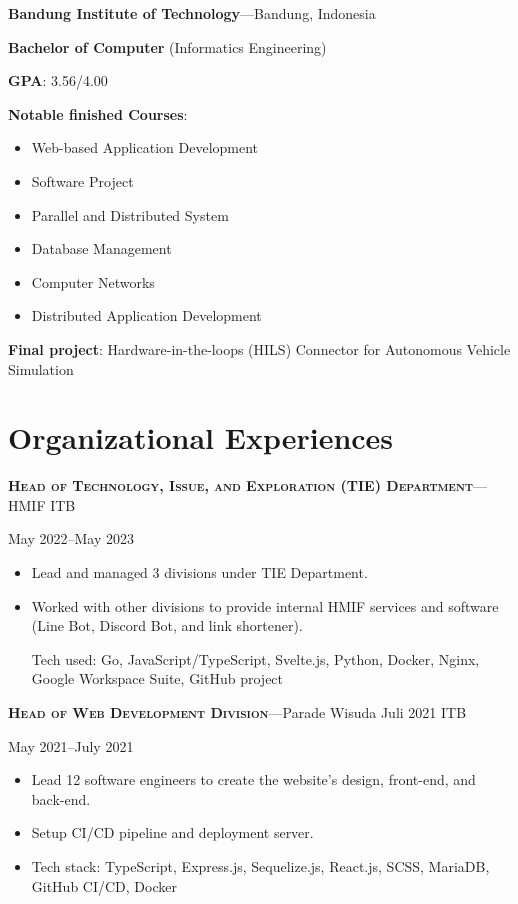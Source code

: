 \documentclass[10pt]{article}
\newcommand{\workExpVspace}{1em}
\newcommand{\orgExp}[5]{
    \noindent \textbf{\textsc{#1}}---#2

    {#3}--{#4}

    {#5}
    \vspace{\workExpVspace}
}
\begin{document}
\textbf{Bandung Institute of Technology}---Bandung, Indonesia

\textbf{Bachelor of Computer} (Informatics Engineering)

\textbf{GPA}: 3.56/4.00

\textbf{Notable finished Courses}:
\begin{multicols}{2}
    \begin{itemize}
        \item Web-based Application Development
        \item Software Project
        \item Parallel and Distributed System
        \item Database Management
        \item Computer Networks
        \item Distributed Application Development
    \end{itemize}
\end{multicols}

\textbf{Final project}: Hardware-in-the-loops (HILS) Connector for Autonomous Vehicle Simulation

\section{Organizational Experiences}

\orgExp
    {Head of Technology, Issue, and Exploration (TIE) Department}
    {HMIF ITB}
    {May 2022}
    {May 2023}
    {
        \begin{itemize}
            \item Lead and managed 3 divisions under TIE Department.
            \item Worked with other divisions to provide internal HMIF services and software (Line
                Bot, Discord Bot, and link shortener).

                Tech used: Go, JavaScript/TypeScript, Svelte.js, Python, Docker, Nginx, Google
                Workspace Suite, GitHub project
        \end{itemize}
    }
    
\orgExp
{Head of Web Development Division}
{Parade Wisuda Juli 2021 ITB}
{May 2021}
{July 2021}
{
    \begin{itemize}
        \item Lead 12 software engineers to create the website's design, front-end, and back-end.
        \item Setup CI/CD pipeline and deployment server.
        \item Tech stack: TypeScript, Express.js, Sequelize.js, React.js, SCSS, MariaDB, GitHub
            CI/CD, Docker
    \end{itemize}
}
\end{document}
